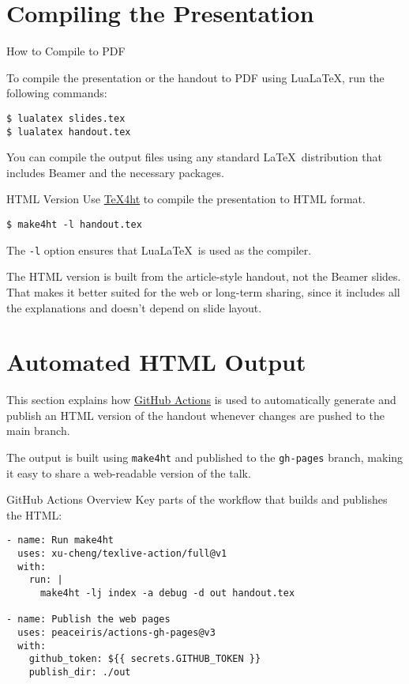 \section{Compiling the Presentation}

\begin{frame}[fragile]{How to Compile to PDF} 

To compile the presentation or the handout to PDF using LuaLaTeX, run the following commands:

\begin{verbatim}
$ lualatex slides.tex
$ lualatex handout.tex
\end{verbatim}
\end{frame}

You can compile the output files using any standard \LaTeX\ distribution that includes Beamer and the necessary packages.

\begin{frame}[fragile]{HTML Version}
  Use \href{https://www.tug.org/tex4ht/}{\TeX4ht} to compile the presentation to HTML format. 
\begin{verbatim}
$ make4ht -l handout.tex    
\end{verbatim}

The \verb|-l| option  ensures that Lua\LaTeX\ is used as the compiler. 
\end{frame}

The HTML version is built from the article-style handout, not the Beamer
slides. That makes it better suited for the web or long-term sharing, since it
includes all the explanations and doesn’t depend on slide layout.

\section{Automated HTML Output}
This section explains how \href{https://docs.github.com/en/actions/writing-workflows/quickstart}{GitHub Actions} is used to automatically generate and
publish an HTML version of the handout whenever changes are pushed to the main
branch.

The output is built using \texttt{make4ht} and published to the
\texttt{gh-pages} branch, making it easy to share a web-readable version of the
talk. 

\begin{frame}[fragile]{GitHub Actions Overview}
Key parts of the workflow that builds and publishes the HTML:

\begin{verbatim}
- name: Run make4ht
  uses: xu-cheng/texlive-action/full@v1
  with:
    run: |
      make4ht -lj index -a debug -d out handout.tex

- name: Publish the web pages
  uses: peaceiris/actions-gh-pages@v3
  with:
    github_token: ${{ secrets.GITHUB_TOKEN }}
    publish_dir: ./out
\end{verbatim}

\end{frame}

